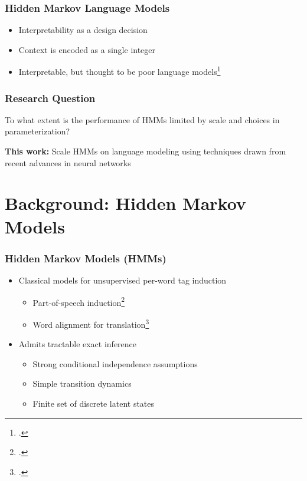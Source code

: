 \documentclass{beamer}
\begin{document}
\begin{frame}
\frametitle{Hidden Markov Language Models}
\begin{itemize}
\item Interpretability as a design decision
\vspace{2em}
\item Context is encoded as a single integer
\vspace{2em}
\item Interpretable, but thought to be poor language models\footcite{buys2018hmm}
\end{itemize}
\end{frame}

\begin{frame}
\frametitle{Research Question}
To what extent is the performance of HMMs limited by scale and choices in parameterization?

\vspace{2em}

\textbf{This work:} Scale HMMs on
language modeling using techniques
drawn from recent advances in neural networks
\end{frame}


\section{Background: Hidden Markov Models}
\begin{frame}
\frametitle{Hidden Markov Models (HMMs)}
\begin{itemize}
\item Classical models for unsupervised per-word tag induction
\vspace{1em}
    \begin{itemize}
    \item Part-of-speech induction\footcite{merialdo1994tagging}
    \vspace{1em}
    \item Word alignment for translation\footcite{vogel1996hmm}
    \end{itemize}
\vspace{1em}
\item Admits tractable exact inference
\vspace{1em}
    \begin{itemize}
    \item Strong conditional independence assumptions
    \vspace{1em}
    \item Simple transition dynamics
    \vspace{1em}
    \item Finite set of discrete latent states
    \end{itemize}
\end{itemize}
\end{frame}
\end{document}
